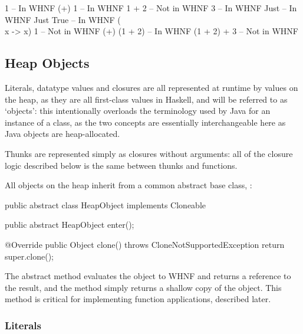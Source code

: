 \documentclass[dissertation.tex]{subfiles}
\begin{document}
{{        \begin{haskellfigure}
        1               -- In WHNF
        (+) 1           -- In WHNF
        1 + 2           -- Not in WHNF
        3               -- In WHNF
        Just            -- In WHNF
        Just True       -- In WHNF
        (\\x -> x) 1    -- Not in WHNF
        (+) (1 + 2)     -- In WHNF
        (1 + 2) + 3     -- Not in WHNF
        \end{haskellfigure}
    }
    \subsection{Heap Objects}\label{sec:heap-objects}
    {

        Literals, datatype values and closures are all represented at runtime by values on the heap, as they are all
        first-class values in Haskell, and will be referred to as `objects': this intentionally overloads the
        terminology used by Java for an instance of a class, as the two concepts are essentially interchangeable
        here as Java objects are heap-allocated.

        Thunks are represented simply as closures without arguments: all of the closure logic described below is the
        same between thunks and functions.

        All objects on the heap inherit from a common abstract base class, :

        \begin{javafigure}
        public abstract class HeapObject implements Cloneable {
            public abstract HeapObject enter();

            @Override
            public Object clone() throws CloneNotSupportedException {
                return super.clone();
            }
        }
        \end{javafigure}

        The abstract  method evaluates the object to WHNF and returns a reference to the result, and the
         method simply returns a shallow copy of the object. This method is critical for implementing
        function applications, described later.

        \subsubsection{Literals}\label{sec:literals}
        {
            
}}}
\end{document}
